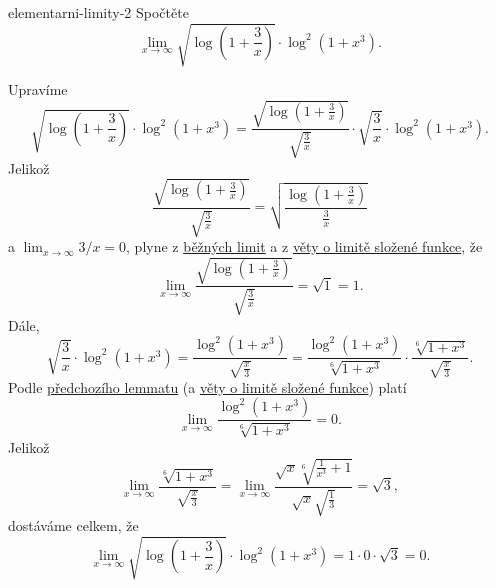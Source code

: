\begin{problem}{}{elementarni-limity-2}
 Spočtěte
 \[
  \lim_{x \to \infty} \sqrt{\log \left( 1 + \frac{3}{x} \right)} \cdot
  \log^2(1+x^3).
 \]
\end{problem}
\begin{probsol}
 Upravíme
 \[
  \sqrt{\log \left( 1 + \frac{3}{x} \right)} \cdot \log^2(1+x^3) =
  \frac{\sqrt{\log \left( 1 + \frac{3}{x} \right)}}{\sqrt{\frac{3}{x}}} \cdot
  \sqrt{\frac{3}{x}} \cdot \log^2(1 + x^3).
 \]
 Jelikož
 \[
  \frac{\sqrt{\log \left( 1 + \frac{3}{x} \right)}}{\sqrt{\frac{3}{x}}} =
  \sqrt{\frac{\log \left(1 + \frac{3}{x}\right)}{\frac{3}{x}}}
 \]
 a $\lim_{x \to \infty} 3 / x = 0$, plyne z \hyperref[prop:bezne-limity]{běžných
 limit} a z \hyperref[thm:limita-slozene-funkce]{věty o limitě složené funkce},
 že
 \[
  \lim_{x \to \infty} \frac{\sqrt{\log \left( 1 + \frac{3}{x}
  \right)}}{\sqrt{\frac{3}{x}}} = \sqrt{1} = 1.
 \]
 Dále,
 \[
  \sqrt{\frac{3}{x}} \cdot \log^2(1 + x^3) = \frac{\log^2(1 +
  x^3)}{\sqrt{\frac{x}{3}}} = \frac{\log^2(1 + x^3)}{\sqrt[6]{1+x^3}} \cdot
  \frac{\sqrt[6]{1+x^3}}{\sqrt{\frac{x}{3}}}.
 \]
 Podle \hyperref[lem:log-podle-x]{předchozího lemmatu} (a
 \hyperref[thm:limita-slozene-funkce]{věty o limitě složené funkce}) platí
 \[
  \lim_{x \to \infty} \frac{\log^2(1 + x^3)}{\sqrt[6]{1+x^3}} = 0.
 \]
 Jelikož
 \[
  \lim_{x \to \infty} \frac{\sqrt[6]{1+x^3}}{\sqrt{\frac{x}{3}}} = \lim_{x \to
  \infty} \frac{\sqrt{x} \sqrt[6]{\frac{1}{x^3} +
  1}}{\sqrt{x}\sqrt{\frac{1}{3}}} = \sqrt{3},
 \]
 dostáváme celkem, že
 \[
  \lim_{x \to \infty} \sqrt{\log \left( 1+\frac{3}{x} \right)} \cdot \log^2(1 +
  x^3) = 1 \cdot 0 \cdot \sqrt{3} = 0.
 \]
\end{probsol}

